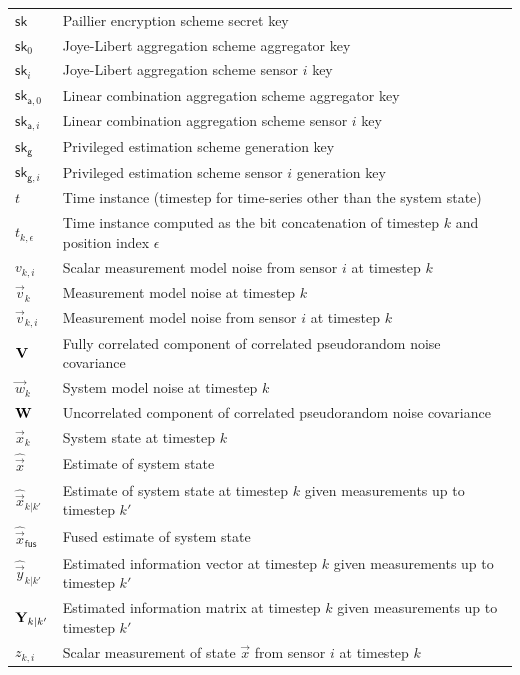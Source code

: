 \documentclass[oneside]{scrbook}
\theoremstyle{definition}
\theoremstyle{definition}
\theoremstyle{remark}
\begin{document}
\begin{longtable}{p{}p{}}
    $\mathsf{sk}$ & Paillier encryption scheme secret key\\
    $\mathsf{sk}_0$ & Joye-Libert aggregation scheme aggregator key\\
    $\mathsf{sk}_i$ & Joye-Libert aggregation scheme sensor $i$ key\\
    $\mathsf{sk}_{\mathsf{a},0}$ & Linear combination aggregation scheme aggregator key\\
    $\mathsf{sk}_{\mathsf{a},i}$ & Linear combination aggregation scheme sensor $i$ key\\
    $\mathsf{sk}_\mathsf{g}$ & Privileged estimation scheme generation key\\
    $\mathsf{sk}_{\mathsf{g},i}$ & Privileged estimation scheme sensor $i$ generation key\\
    $t$ & Time instance (timestep for time-series other than the system state)\\
    $t_{k,\epsilon}$ & Time instance computed as the bit concatenation of timestep $k$ and position index $\epsilon$\\
    $v_{k,i}$ & Scalar measurement model noise from sensor $i$ at timestep $k$\\
    $\vec{v}_k$ & Measurement model noise at timestep $k$\\
    $\vec{v}_{k,i}$ & Measurement model noise from sensor $i$ at timestep $k$\\
    ${{\mathbf{V}}}$ & Fully correlated component of correlated pseudorandom noise covariance\\
    $\vec{w}_k$ & System model noise at timestep $k$\\
    ${{\mathbf{W}}}$ & Uncorrelated component of correlated pseudorandom noise covariance\\
    $\vec{x}_k$ & System state at timestep $k$\\
    $\hat{\vec{x}}$ & Estimate of system state\\
    $\hat{\vec{x}}_{k|k'}$ & Estimate of system state at timestep $k$ given measurements up to timestep $k'$\\
    $\hat{\vec{x}}_{\mathsf{fus}}$ & Fused estimate of system state\\
    $\hat{\vec{y}}_{k|k'}$ & Estimated information vector at timestep $k$ given measurements up to timestep $k'$\\
    ${{\mathbf{Y}}}_{k|k'}$ & Estimated information matrix at timestep $k$ given measurements up to timestep $k'$\\
    $z_{k,i}$ & Scalar measurement of state $\vec{x}$ from sensor $i$ at timestep $k$\\

\end{longtable}
\end{document}
